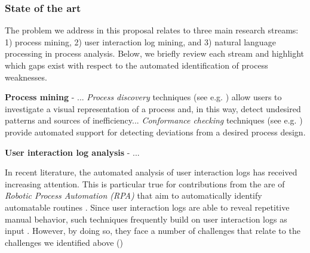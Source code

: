  \subsubsection{State of the art}

The problem we address in this proposal relates to three main research streams: 1) process mining, 2) user interaction log mining, and 3) natural language processing in process analysis. Below, we briefly review each stream and highlight which gaps exist with respect to the automated identification of process weaknesses.  

\textbf{Process mining} - ...  \textit{Process discovery} techniques (see e.g. \cite{gunther2007fuzzy,weijters2011flexible,leemans2013discovering}) allow users to investigate a visual representation of a process and, in this way, detect undesired patterns and sources of inefficiency... \textit{Conformance checking} techniques (see e.g. \cite{rozinat2008conformance,adriansyah2011conformance}) provide automated support for detecting deviations from a desired process design. 
  


\textbf{User interaction log analysis} - ...

In recent literature, the automated analysis of user interaction logs has received increasing attention. This is particular true for contributions from the are of \textit{Robotic Process Automation (RPA)} that aim to automatically identify automatable routines \cite{}. Since user interaction logs are able to reveal repetitive manual behavior, such techniques frequently build on user interaction logs as input \cite{}. However, by doing so, they face a number of challenges that relate to the challenges we identified above ()


